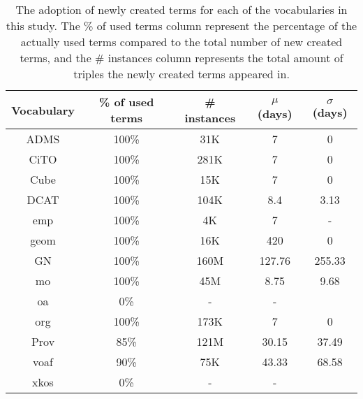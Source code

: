 \begin{table}
	\caption{The adoption of newly created terms for each of the vocabularies in this study. The \% of used terms column represent the percentage of the actually used terms compared to the total number of new created terms, and the \# instances column represents the total amount of triples the newly created terms appeared in.}
	\label{table:NewTerms}
	\begin{tabular}{ccccc}
		\toprule 
		Vocabulary &  \% of used terms& \# instances & $\mu$ (days) & $\sigma$ (days)\\
		\midrule 
		ADMS & 100\% & 31K &  7 & 0\\
		CiTO & 100\% & 281K& 7 & 0\\ 
		Cube & 100\% & 15K & 7 & 0\\ 
		DCAT & 100\% &104K&  8.4 & 3.13\\	 
		emp & 100\% & 4K& 7 & -\\	 
		geom & 100\% &16K&  420 & 0\\	 
		GN & 100\% &160M&  127.76 & 255.33\\	 
		mo & 100\% &45M&  8.75 & 9.68\\	 
		oa & 0\% & - & -\\	 
		org & 100\% &173K&  7 & 0\\	 
		Prov & 85\% &121M&  30.15 & 37.49\\	 
		voaf & 90\% & 75K& 43.33 & 68.58\\	 
		xkos & 0\% &  - & -\\
		\bottomrule 
	\end{tabular}
\end{table}



